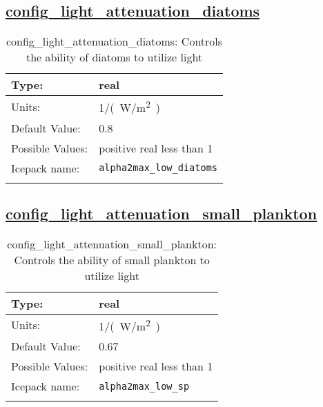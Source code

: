 \subsection[config\_light\_attenuation\_diatoms]{\hyperref[sec:nm_tab_biogeochemistry]{config\_light\_attenuation\_diatoms}}
\label{subsec:nm_sec_config_light_attenuation_diatoms}
\begin{center}
\begin{longtable}{| p{2.0in} || p{4.0in} |}
    \hline
    Type: & real \\
    \hline
    Units: & \si{1/(W/m^2)} \\
    \hline
    Default Value: & 0.8 \\
    \hline
    Possible Values: & positive real less than 1 \\
    \hline
    \hline
    Icepack name: & \verb+alpha2max_low_diatoms+ \\
    \caption{config\_light\_attenuation\_diatoms: Controls the ability of diatoms to utilize light}
\end{longtable}
\end{center}
\subsection[config\_light\_attenuation\_small\_plankton]{\hyperref[sec:nm_tab_biogeochemistry]{config\_light\_attenuation\_small\_plankton}}
\label{subsec:nm_sec_config_light_attenuation_small_plankton}
\begin{center}
\begin{longtable}{| p{2.0in} || p{4.0in} |}
    \hline
    Type: & real \\
    \hline
    Units: & \si{1/(W/m^2)} \\
    \hline
    Default Value: & 0.67 \\
    \hline
    Possible Values: & positive real less than 1 \\
    \hline
    \hline
    Icepack name: & \verb+alpha2max_low_sp+ \\
    \caption{config\_light\_attenuation\_small\_plankton: Controls the ability of small plankton to utilize light}
\end{longtable}
\end{center}
